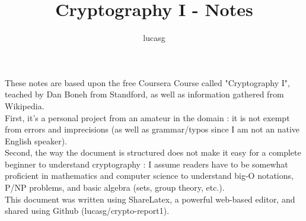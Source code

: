 \documentclass[fleqn,a4paper,12pt]{book}
\title{Cryptography I - Notes \vfill}
\author{lucasg}
\theoremstyle{break}
\begin{document}
\maketitle

\vspace*{6cm}
\hfill
\begin{minipage}[c]{0.8\linewidth}
\begin{Large}

These notes are based upon the free Coursera Course called "Cryptography I", teached by Dan Boneh from Standford, as well as information gathered from Wikipedia.\\
First, it's  a personal project from an amateur in the domain : it is not exempt from errors and imprecisions (as well as grammar/typos since I am not an native English speaker).\\
Second, the way the document is structured does not make it easy for a complete beginner to understand cryptography : I assume readers have to be somewhat proficient in mathematics and computer science to understand big-O notations, P/NP problems, and basic algebra (sets, group theory, etc.). \\

This document was written using ShareLatex, a powerful web-based editor, and shared using Github (lucasg/crypto-report1).

\end{Large}
\end{minipage}


\tableofcontents











\end{document}
